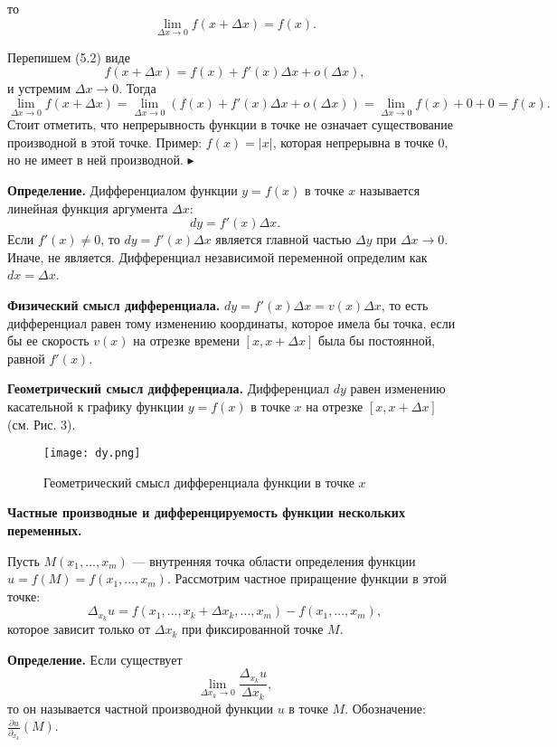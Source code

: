 \documentclass[12pt]{article}
\begin{document}
то 
$$
\lim_{\Delta x \rightarrow 0 } f(x + \Delta x) = f(x).
$$

Перепишем (5.2) виде 
$$
f(x + \Delta x) = f(x) + f'(x)\Delta x + o(\Delta x),
$$
и устремим $\Delta x \rightarrow 0$. Тогда
$$
	\lim_{\Delta x \rightarrow 0} f(x + \Delta x) = \lim_{\Delta x \rightarrow 0} (f(x) + f'(x)\Delta x + o(\Delta x)) = \lim_{\Delta x \rightarrow 0}f(x) + 0 + 0 = f(x).
$$
Стоит отметить, что непрерывность функции в точке не означает существование производной в этой точке. Пример: $f(x) = |x|$, которая непрерывна в точке $0$, но не имеет в ней производной. 
$\blacktriangleright$

\textbf{Определение.} Дифференциалом функции $y = f(x)$ в точке $x$ называется линейная функция аргумента $\Delta x$:
$$
	dy = f'(x)\Delta x.
$$
Если $f'(x) \neq 0$, то $ dy = f'(x)\Delta x $ является главной частью $\Delta y$ при $\Delta x \rightarrow 0$. Иначе, не является. Дифференциал независимой переменной определим как $dx = \Delta x$.


\textbf{Физический смысл дифференциала.}  $dy = f'(x)\Delta x = v(x) \Delta x$, то есть дифференциал равен тому изменению координаты, которое имела бы точка, если бы ее скорость $v(x)$ на отрезке времени $[x, x + \Delta x]$ была бы постоянной, равной $f'(x)$.

\textbf{Геометрический смысл дифференциала.} Дифференциал $dy$ равен изменению касательной к графику функции $y = f(x)$ в точке $x$ на отрезке $[x, x + \Delta x]$ (см. Рис. 3). 


\begin{figure}[h]
\centering
\texttt{[image: dy.png]}
\caption{Геометрический смысл дифференциала функции в точке $x$}
\label{fig:mpr}
\end{figure}

\newpage

\textbf{Частные производные и дифференцируемость функции нескольких переменных.} 

Пусть $M(x_1,...,x_m)$ --- внутренняя точка области определения функции $u = f(M)=f(x_1,..., x_m)$. Рассмотрим частное приращение функции в этой точке:
$$
	\Delta_{x_k}u = f(x_1, ..., x_k + \Delta x_k, ..., x_m)- f(x_1, ..., x_m),
$$ 
которое зависит только от $\Delta x_k$ при фиксированной точке $M$. 


\textbf{Определение.} Если существует 
$$
	\lim_{\Delta x_k \rightarrow 0} \frac{\Delta_{x_k}u}{\Delta x_k}, 
$$
то он называется частной производной функции $u$ в точке $M$. Обозначение: $\frac{\partial u}{\partial_{x_k}}(M)$.
\end{document}
